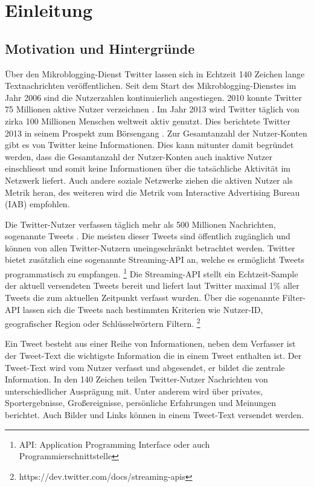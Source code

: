 \chapter{Einleitung}\label{chp:Einleitung}

	\section{Motivation und Hintergründe}

		Über den Mikroblogging-Dienst Twitter lassen sich in Echtzeit 140 Zeichen lange Textnachrichten veröffentlichen.
		Seit dem Start des Mikroblogging-Dienstes im Jahr 2006 sind die Nutzerzahlen kontinuierlich angestiegen.
		2010 konnte Twitter 75 Millionen aktive Nutzer verzeichnen \cite{Cheng2010}.
		Im Jahr 2013 wird Twitter täglich von zirka 100 Millionen Menschen weltweit aktiv genutzt.
		Dies berichtete Twitter 2013 in seinem Prospekt zum Börsengang \cite{twitterinc2013}.  
		Zur Gesamtanzahl der Nutzer-Konten gibt es von Twitter keine Informationen. 
		Dies kann mitunter damit begründet werden, dass die Gesamtanzahl der Nutzer-Konten auch inaktive Nutzer einschliesst und somit keine Informationen über die tatsächliche Aktivität im Netzwerk liefert. 
		Auch andere soziale Netzwerke ziehen die aktiven Nutzer als Metrik heran, des weiteren wird die Metrik vom Interactive Advertising Bureau (IAB) empfohlen. \cite{IAB}
		
		Die Twitter-Nutzer verfassen täglich mehr als 500 Millionen Nachrichten, sogenannte Tweets \cite{twitterinc2013}.
		Die meisten dieser Tweets sind öffentlich zugänglich und können von allen Twitter-Nutzern uneingeschränkt betrachtet werden. 
		Twitter bietet zusätzlich eine sogenannte Streaming-API an, welche es ermöglicht Tweets programmatisch zu empfangen. \footnote{API: Application Programming Interface oder auch Programmierschnittstelle}
		Die Streaming-API stellt ein Echtzeit-Sample der aktuell versendeten Tweets bereit und liefert laut Twitter maximal 1\% aller Tweets die zum aktuellen Zeitpunkt verfasst wurden.
		Über die sogenannte Filter-API lassen sich die Tweets nach bestimmten Kriterien wie Nutzer-ID, geografischer Region oder Schlüsselwörtern Filtern.
		 \footnote{https://dev.twitter.com/docs/streaming-apis} 

		Ein Tweet besteht aus einer Reihe von Informationen, neben dem Verfasser ist der Tweet-Text die wichtigste Information die in einem Tweet enthalten ist.  
		Der Tweet-Text wird vom Nutzer verfasst und abgesendet, er bildet die zentrale Information. 
		In den 140 Zeichen teilen Twitter-Nutzer Nachrichten von unterschiedlicher Ausprägung mit.
		Unter anderem wird über privates, Sportergebnisse, Großereignisse, persönliche Erfahrungen und Meinungen berichtet. 
		Auch Bilder und Links können in einem Tweet-Text versendet werden. 

